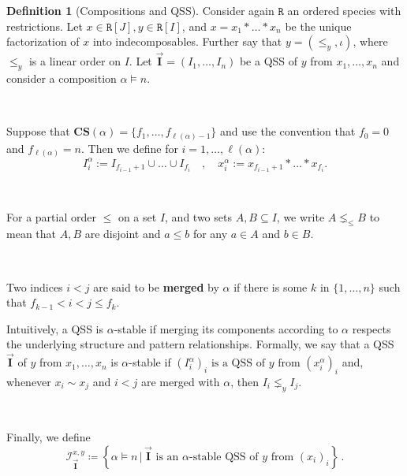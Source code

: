 \documentclass[12pt, reqno]{amsart}
\theoremstyle{definition}
\newtheorem{defin}[thm]{Definition}
\newcommand{\III}{\vec{\mathbf{I}}}
\begin{document}
\begin{defin}[Compositions and QSS]
Consider again $\mathtt{R}$ an ordered species with restrictions.
Let $x \in \mathtt{R}[J], y \in  \mathtt{R}[I]$, and $x = x_1\ast \dots \ast x_n$ be the unique factorization of $x$ into indecomposables.
Further say that $y = (\leq_y, \iota)$, where $\leq_y$ is a linear order on $I$.
Let $\III = (I_1, \dots , I_n)$ be a QSS of $y$ from $x_1, \dots, x_n$ and consider a composition $\alpha \models n$.

\

Suppose that $ \mathbf{CS} (\alpha) = \{f_1, \dots, f_{\ell(\alpha) - 1} \}$ and use the convention that $f_0 = 0$ and $f_{\ell(\alpha)} = n$. 
Then we define for $i = 1, \dots, \ell(\alpha)$:
\[I^{\alpha}_i := I_{f_{i-1} + 1} \cup \dots \cup I_{f_i} \quad , \quad x^{\alpha}_i := x_{f_{i-1} + 1} \ast \dots \ast x_{f_i}.\]

\

For a partial order $\leq$ on a set $I$, and two sets $A, B \subseteq I$, we write $A \lneq_{\leq} B$ to mean that $A, B$ are disjoint and $a \leq b$ for any $a \in A$ and $b \in B$.

\

Two indices $i< j$ are said to be \textbf{merged} by $\alpha$ if there is some $k$ in $\{1, \dots, n\}$ such that $ f_{k-1} < i < j \leq f_k$.

Intuitively, a QSS is $\alpha$-stable if merging its components according to $\alpha$ respects the underlying structure and pattern relationships.
Formally, we say that a QSS $\III$ of $y$ from $x_1, \dots , x_n$ is $\alpha $-stable if $(I^{\alpha}_i)_i \text{ is a QSS of $y$ from } (x^{\alpha}_i)_i$ and, whenever $x_i \sim x_j$ and $i < j$ are merged with $\alpha $, then $I_i \lneq_y I_j$.

\

Finally, we define 
\begin{equation}
   \mathcal I^{x, y}_{\III} \coloneqq \left\{ \alpha \models n \,\Big| \,\III \text{ is an $\alpha$-stable QSS of $y$ from } (x_i)_i \right\} \, . 
\end{equation}
\end{defin}

\
\end{document}
